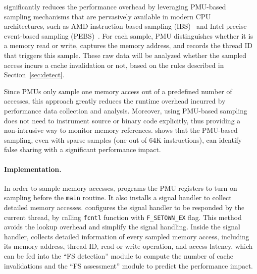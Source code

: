 \cheetah{} significantly reduces the performance overhead by leveraging PMU-based sampling mechanisms that are pervasively available in modern CPU architectures, such as AMD instruction-based sampling (IBS)~\cite{AMDIBS:07} and Intel precise event-based sampling (PEBS)~\cite{IntelArch:PEBS:Sept09}. For each sample, PMU distinguishes whether it is a memory read or write, captures the memory address, and records the thread ID that triggers this sample. These raw data will be analyzed whether the sampled access incurs a cache invalidation or not, based on the rules described in Section~\ref{sec:detect}.

Since PMUs only sample one memory access out of a predefined number of accesses, this approach greatly reduces the runtime overhead incurred by performance data collection and analysis. Moreover, using PMU-based sampling does not need to instrument source or binary code explicitly, thus providing a non-intrusive way to monitor memory references. \cheetah{} shows that the PMU-based sampling, even with sparse samples (one out of 64K instructions), can identify false sharing with a significant performance impact.
 

\paragraph{Implementation.} 

In order to sample memory accesses, \cheetah{} programs the PMU registers to turn on sampling before the \texttt{main} routine. It also installs a signal handler to collect detailed memory accesses. \Cheetah{} configures the signal handler to be responded by the current thread, by calling \texttt{fcntl} function with \texttt{F\_SETOWN\_EX} flag. This method avoids the lookup overhead and  simplify the signal handling. Inside the signal handler, \Cheetah{} collects detailed information of every sampled memory access, including its memory address, thread ID, read or write operation, and access latency, which can be fed into the ``FS detection'' module to compute the number of cache invalidations and the ``FS assessment'' module to predict the performance impact.


